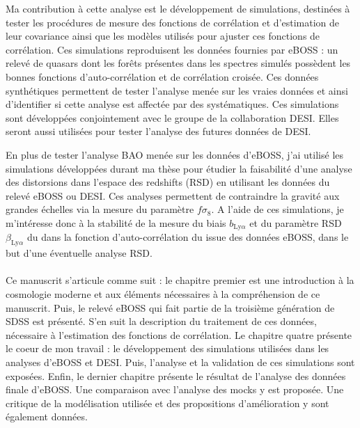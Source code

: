 \documentclass[11pt, twoside, a4paper, openright]{report}
\begin{document}
Ma contribution à cette analyse est le développement de simulations, destinées à tester les procédures de mesure des fonctions de corrélation et d'estimation de leur covariance ainsi que les modèles utilisés pour ajuster ces fonctions de corrélation.
Ces simulations reproduisent les données fournies par eBOSS : un relevé de quasars dont les forêts \lya{} présentes dans les spectres simulés possèdent les bonnes fonctions d'auto-corrélation et de corrélation croisée.
Ces données synthétiques permettent de tester l'analyse menée sur les vraies données et ainsi d'identifier si cette analyse est affectée par des systématiques.
Ces simulations sont développées conjointement avec le groupe \lya{} de la collaboration DESI. Elles seront aussi utilisées pour tester l'analyse des futures données de DESI.

En plus de tester l'analyse BAO menée sur les données d'eBOSS, j'ai utilisé les simulations développées durant ma thèse pour étudier la faisabilité d'une analyse des distorsions dans l'espace des redshifts (RSD) en utilisant les données \lya{} du relevé eBOSS ou DESI.
Ces analyses permettent de contraindre la gravité aux grandes échelles via la mesure du paramètre $f \sigma_8$. A l'aide de ces simulations, je m'intéresse donc à la stabilité de la mesure du biais $b_{\mathrm{Ly}\alpha}$ et du paramètre RSD $\beta_{\mathrm{Ly}\alpha}$ du \lya{} dans la fonction d'auto-corrélation du \lya{} issue des données eBOSS, dans le but d'une éventuelle analyse RSD.

\paragraph{}
Ce manuscrit s'articule comme suit : le chapitre premier est une introduction à la cosmologie moderne et aux éléments nécessaires à la compréhension de ce manuscrit.
Puis, le relevé eBOSS  qui fait partie de la troisième génération de SDSS est présenté.
S'en suit la description du traitement de ces données, nécessaire à l'estimation des fonctions de corrélation.
Le chapitre quatre présente le coeur de mon travail : le développement des simulations utilisées dans les analyses \lya{} d'eBOSS et DESI.
Puis, l'analyse et la validation de ces simulations sont exposées.
Enfin, le dernier chapitre présente le résultat de l'analyse des données finale d'eBOSS. Une comparaison avec l'analyse des mocks y est proposée.
Une critique de la modélisation utilisée et des propositions d'amélioration y sont également données.
\end{document}
